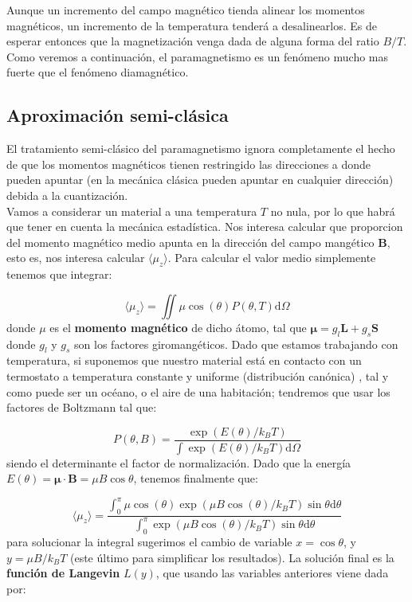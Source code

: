 \documentclass[12pt,a4paper]{book}
\numberwithin{equation}{section}
\numberwithin{figure}{section}
\newcommand{\parentesis}[1]{\left( #1  \right)}
\newcommand{\D}{\mathrm{d}}
\newcommand{\Bn}{\mathbf{B}}
\newcommand{\Ln}{\mathbf{L}}
\newcommand{\Sn}{\mathbf{S}}
\newcommand{\mun}{\boldsymbol{\mu}}
\begin{document}
Aunque un incremento del campo magnético tienda alinear los momentos magnéticos, un incremento de la temperatura tenderá a desalinearlos. Es de esperar entonces que la magnetización venga dada de alguna forma del ratio $B/T$. Como veremos a continuación, el paramagnetismo es un fenómeno mucho mas fuerte que el fenómeno diamagnético.


\subsection{Aproximación semi-clásica}

El tratamiento semi-clásico del paramagnetismo ignora completamente el hecho de que los momentos magnéticos tienen restringido las direcciones a donde pueden apuntar (en la mecánica clásica pueden apuntar en cualquier dirección) debida a la cuantización. \\

Vamos a considerar un material a una temperatura $T$ no nula, por lo que habrá que tener en cuenta la mecánica estadística. Nos interesa calcular que proporcion del momento magnético medio apunta en la dirección del campo mangético $\Bn$, esto es, nos interesa calcular $\langle \mu_z \rangle$. Para calcular el valor medio simplemente tenemos que integrar:

$$  \langle \mu_z \rangle = \iint \mu \cos (\theta) P (\theta,T)  \D \Omega $$
donde $\mu$ es el \textbf{momento magnético} de dicho átomo, tal que $\mun = g_l \Ln + g_s \Sn $ donde $g_l$ y $g_s$ son los factores giromangéticos. Dado que estamos trabajando con temperatura, si suponemos que nuestro material está en contacto con un termostato a temperatura constante y uniforme (distribución canónica) , tal y como puede ser un océano, o el aire de una habitación; tendremos que usar los factores de Boltzmann tal que:

\begin{equation}
P (\theta,B) = \frac{\exp \parentesis{E(\theta)/k_B T}}{\int \exp\parentesis{E(\theta)/k_B T} \D \Omega}
\end{equation} 
siendo el determinante el factor de normalización. Dado que la energía $E(\theta) = \mun \cdot \Bn = \mu B \cos \theta$, tenemos finalmente que:

\begin{equation}
\langle \mu_z \rangle = \frac{\int_0^\pi \mu \cos (\theta) \exp \parentesis{\mu B \cos (\theta) / k_B T} \sin \theta \D \theta}{\int_0^\pi \exp \parentesis{\mu B \cos (\theta) / k_B T} \sin \theta \D \theta}
\end{equation}
para solucionar la integral sugerimos el cambio de variable $x=\cos \theta$, y $y=\mu B / k_B T$ (este último para simplificar los resultados). La solución final es la \textbf{función de Langevin} $L(y)$, que usando las variables anteriores viene dada por:
\end{document}

